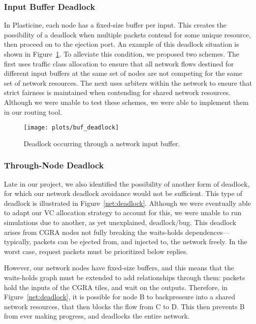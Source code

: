 \subsubsection{Input Buffer Deadlock}
In Plasticine, each node has a fixed-size buffer per input. This creates the possibility of a deadlock when multiple packets contend for some unique resource, then proceed on to the ejection port. An example of this deadlock situation is shown in Figure~\ref{inbuf:deadlock}. To alleviate this condition, we proposed two schemes. The first uses traffic class allocation to ensure that all network flows destined for different input buffers at the same set of nodes are not competing for the same set of network resources. The next uses arbiters within the network to ensure that strict fairness is maintained when contending for shared network resources. Although we were unable to test these schemes, we were able to implement them in our routing tool.

\begin{figure}
  \centering
  \texttt{[image: plots/buf\_deadlock]}
  \caption{Deadlock occurring through a network input buffer.}
  \label{inbuf:deadlock}
\end{figure}

\subsubsection{Through-Node Deadlock}
Late in our project, we also identified the possibility of another form of deadlock, for which our network deadlock avoidance would not be sufficient. This type of deadlock is illustrated in Figure~\ref{net:deadlock}. Although we were eventually able to adapt our VC allocation strategy to account for this, we were unable to run simulations due to another, as yet unexplained, deadlock/bug. This deadlock arises from CGRA nodes not fully breaking the waits-holds dependences---typically, packets can be ejected from, and injected to, the network freely. In the worst case, request packets must be prioritized below replies.

However, our network nodes have fixed-size buffers, and this means that the waits-holds graph must be extended to add relationships through them: packets hold the inputs of the CGRA tiles, and wait on the outputs. Therefore, in Figure~\ref{net:deadlock}, it is possible for node B to backpressure into a shared network resources, that then blocks the flow from C to D. This then prevents B from ever making progress, and deadlocks the entire network. 


